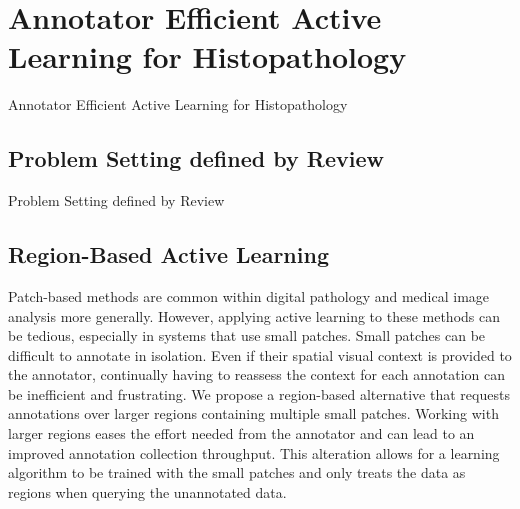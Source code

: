 \section{Annotator Efficient Active Learning for Histopathology}
\label{sec:active_annotator_efficient}
Annotator Efficient Active Learning for Histopathology

\subsection{Problem Setting defined by Review}
\label{subsec:active_problem_settings}
Problem Setting defined by Review

\subsection{Region-Based Active Learning}
\label{subsec:active_region_based}
Patch-based methods are common within digital pathology and medical image analysis more generally. However, applying active learning to these methods can be tedious, especially in systems that use small patches. Small patches can be difficult to annotate in isolation. Even if their spatial visual context is provided to the annotator, continually having to reassess the context for each annotation can be inefficient and frustrating.  We propose a region-based alternative that requests annotations over larger regions containing multiple small patches. Working with larger regions eases the effort needed from the annotator and can lead to an improved annotation collection throughput. This alteration allows for a learning algorithm to be trained with the small patches and only treats the data as regions when querying the unannotated data.

